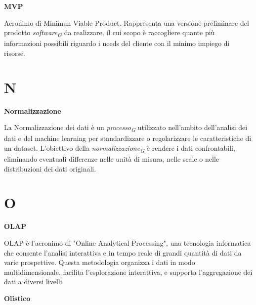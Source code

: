 \documentclass{article}
\begin{document}
\vspace{0.4cm}

\textbf{MVP}

\vspace{0.1cm}

Acronimo di Minimun Viable Product. Rappresenta una versione preliminare del prodotto \textit{software}\textsubscript{\textit{G}} da realizzare, il cui scopo è raccogliere quante più informazioni possibili riguardo i needs del cliente con il minimo impiego di risorse.

\pagebreak
\section*{N}
{}

\vspace{0.4cm}

\textbf{Normalizzazione}

\vspace{0.1cm}

La Normalizzazione dei dati è un \textit{processo}\textsubscript{\textit{G}} utilizzato nell'ambito dell'analisi dei dati e del machine learning per standardizzare o regolarizzare le caratteristiche di un dataset. L'obiettivo della \textit{normalizzazione}\textsubscript{\textit{G}} è rendere i dati confrontabili, eliminando eventuali differenze nelle unità di misura, nelle scale o nelle distribuzioni dei dati originali.

\pagebreak
\section*{O}
{}

\vspace{0.4cm}

\textbf{OLAP}

\vspace{0.1cm}

OLAP è l'acronimo di "Online Analytical Processing", una tecnologia informatica che consente l'analisi interattiva e in tempo reale di grandi quantità di dati da varie prospettive. Questa metodologia organizza i dati in modo multidimensionale, facilita l'esplorazione interattiva, e supporta l'aggregazione dei dati a diversi livelli.

\vspace{0.4cm}

\textbf{Olistico}
\end{document}

